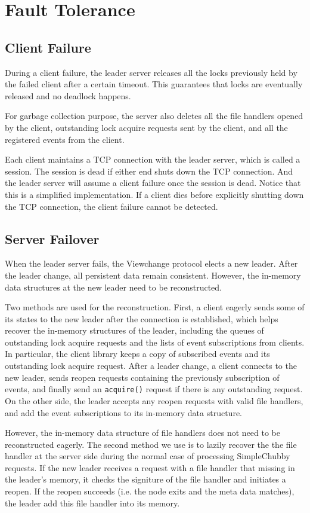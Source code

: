 \section{Fault Tolerance}
\label{section:failure}

\subsection{Client Failure}

During a client failure, the leader server releases all the locks
previously held by the failed client after a certain timeout.
This guarantees that locks are eventually released and no deadlock happens.

For garbage collection
purpose, the server also deletes all the file handlers opened by the client,
outstanding lock acquire requests sent by the client, and all the registered
events from the client.

Each client maintains a TCP connection with the leader server,
which is called a session.
The session is dead if either end shuts down the TCP connection.
And the leader server will assume a client failure once the session is dead.
Notice that this is a simplified implementation.
If a client dies before explicitly shutting down the TCP connection,
the client failure cannot be detected.

\subsection{Server Failover}

When the leader server fails, the Viewchange protocol elects a new leader. After
the leader change, all persistent data remain consistent. However, the in-memory
data structures at the new leader need to be reconstructed. 

Two methods are used for the reconstruction.
First, a client eagerly sends some of its states to the new leader after the
connection is established, which helps recover the in-memory structures of
the leader, including the queues of outstanding lock acquire requests and
the lists of event subscriptions from clients. In particular, the client library
keeps a copy of subscribed events and its outstanding lock acquire request.
After a leader change, a client connects to the new leader, sends
reopen requests containing the previously subscription of events, and finally
send an \texttt{acquire()} request if there is any outstanding request.
On the other side, the leader accepts any reopen requests with valid file
handlers, and add the event subscriptions to its in-memory data structure.

However, the in-memory data structure of file handlers does not need to be
reconstructed eagerly. The second method we use is to lazily recover the
the file handler at the server side during the normal case of processing
SimpleChubby requests.
If the new leader receives a request with a file handler that
missing in the leader's memory, it checks the signiture of the file
handler and initiates a reopen. If the reopen succeeds (i.e. the node exits
and the meta data matches), the leader add this file handler into its memory.
